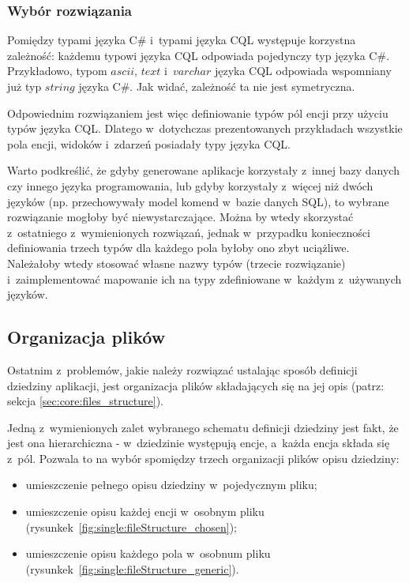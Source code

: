 \subsubsection{Wybór rozwiązania}

Pomiędzy typami języka C\# i~typami języka CQL występuje korzystna zależność: każdemu typowi języka CQL odpowiada pojedynczy typ języka C\#.
Przykładowo, typom $ascii$, $text$ i~$varchar$ języka CQL odpowiada wspomniany już typ $string$ języka C\#.
Jak widać, zależność ta nie jest symetryczna.

Odpowiednim rozwiązaniem jest więc definiowanie typów pól encji przy użyciu typów języka CQL.
Dlatego w~dotychczas prezentowanych przykładach wszystkie pola encji, widoków i~zdarzeń posiadały typy języka CQL.

Warto podkreślić, że gdyby generowane aplikacje korzystały z~innej bazy danych czy innego języka programowania, lub gdyby korzystały z~więcej niż dwóch języków (np. przechowywały model komend w~bazie danych SQL), to wybrane rozwiązanie mogłoby być niewystarczające.
Można by wtedy skorzystać z~ostatniego z~wymienionych rozwiązań, jednak w~przypadku konieczności definiowania trzech typów dla każdego pola byłoby ono zbyt uciążliwe.
Należałoby wtedy stosować własne nazwy typów (trzecie rozwiązanie) i~zaimplementować mapowanie ich na typy zdefiniowane w~każdym z~używanych języków.


\subsection{Organizacja plików}

Ostatnim z~problemów, jakie należy rozwiązać ustalając sposób definicji dziedziny aplikacji, jest organizacja plików składających się na jej opis (patrz: sekcja \ref{sec:core:files_structure}).

Jedną z~wymienionych zalet wybranego schematu definicji dziedziny jest fakt, że jest ona hierarchiczna - w~dziedzinie występują encje, a~każda encja składa się z~pól.
Pozwala to na wybór spomiędzy trzech organizacji plików opisu dziedziny:

\begin{itemize}
 \item umieszczenie pełnego opisu dziedziny w~pojedycznym pliku;
 \item umieszczenie opisu każdej encji w~osobnym pliku (rysunkek~\ref{fig:single:fileStructure_chosen});
 \item umieszczenie opisu każdego pola w~osobnum pliku (rysunkek~\ref{fig:single:fileStructure_generic}).
\end{itemize}

